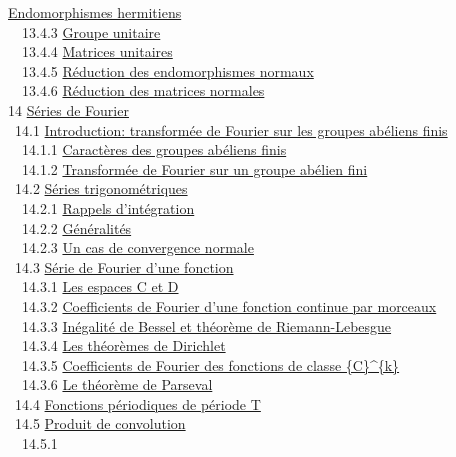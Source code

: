 \documentclass[]{article}
\begin{document}
\href{coursse76.html\#x92-41900013.4.2}{Endomorphismes hermitiens} \\
~~13.4.3 \href{coursse76.html\#x92-42000013.4.3}{Groupe unitaire} \\
~~13.4.4 \href{coursse76.html\#x92-42100013.4.4}{Matrices unitaires} \\
~~13.4.5 \href{coursse76.html\#x92-42200013.4.5}{Réduction des
endomorphismes normaux} \\ ~~13.4.6
\href{coursse76.html\#x92-42300013.4.6}{Réduction des matrices normales}
\\ 14 \href{coursch15.html\#x93-42400014}{Séries de Fourier} \\ ~14.1
\href{coursse77.html\#x94-42500014.1}{Introduction: transformée de
Fourier sur les groupes abéliens finis} \\ ~~14.1.1
\href{coursse77.html\#x94-42600014.1.1}{Caractères des groupes abéliens
finis} \\ ~~14.1.2 \href{coursse77.html\#x94-42700014.1.2}{Transformée
de Fourier sur un groupe abélien fini} \\ ~14.2
\href{coursse78.html\#x95-42800014.2}{Séries trigonométriques} \\
~~14.2.1 \href{coursse78.html\#x95-42900014.2.1}{Rappels d'intégration}
\\ ~~14.2.2 \href{coursse78.html\#x95-43000014.2.2}{Généralités} \\
~~14.2.3 \href{coursse78.html\#x95-43100014.2.3}{Un cas de convergence
normale} \\ ~14.3 \href{coursse79.html\#x96-43200014.3}{Série de Fourier
d'une fonction} \\ ~~14.3.1 \href{coursse79.html\#x96-43300014.3.1}{Les
espaces C et D} \\ ~~14.3.2
\href{coursse79.html\#x96-43400014.3.2}{Coefficients de Fourier d'une
fonction continue par morceaux} \\ ~~14.3.3
\href{coursse79.html\#x96-43500014.3.3}{Inégalité de Bessel et théorème
de Riemann-Lebesgue} \\ ~~14.3.4
\href{coursse79.html\#x96-43600014.3.4}{Les théorèmes de Dirichlet} \\
~~14.3.5 \href{coursse79.html\#x96-43700014.3.5}{Coefficients de Fourier
des fonctions de classe \{C\}\^{}\{k\}} \\ ~~14.3.6
\href{coursse79.html\#x96-43800014.3.6}{Le théorème de Parseval} \\
~14.4 \href{coursse80.html\#x97-43900014.4}{Fonctions périodiques de
période T} \\ ~14.5 \href{coursse81.html\#x98-44000014.5}{Produit de
convolution} \\ ~~14.5.1
\end{document}
